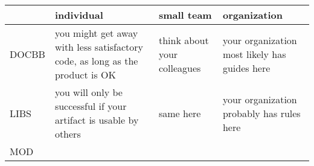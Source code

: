 \documentclass[a4paper
]{article}
\begin{document}
\begin{landscape}

\begin{longtable}[]{@{}llll@{}}
\toprule
\begin{minipage}[b]{0.19\columnwidth}\raggedright
\strut
\end{minipage} & \begin{minipage}[b]{0.28\columnwidth}\raggedright
individual\strut
\end{minipage} & \begin{minipage}[b]{0.28\columnwidth}\raggedright
small team\strut
\end{minipage} & \begin{minipage}[b]{0.14\columnwidth}\raggedright
organization\strut
\end{minipage}\tabularnewline
\midrule
\endhead
\begin{minipage}[t]{0.19\columnwidth}\raggedright
DOCBB\strut
\end{minipage} & \begin{minipage}[t]{0.28\columnwidth}\raggedright
you might get away with less satisfactory code, as long as the product
is OK\strut
\end{minipage} & \begin{minipage}[t]{0.28\columnwidth}\raggedright
think about your colleagues\strut
\end{minipage} & \begin{minipage}[t]{0.14\columnwidth}\raggedright
your organization most likely has guides here\strut
\end{minipage}\tabularnewline
\begin{minipage}[t]{0.19\columnwidth}\raggedright
LIBS\strut
\end{minipage} & \begin{minipage}[t]{0.28\columnwidth}\raggedright
you will only be successful if your artifact is usable by others\strut
\end{minipage} & \begin{minipage}[t]{0.28\columnwidth}\raggedright
same here\strut
\end{minipage} & \begin{minipage}[t]{0.14\columnwidth}\raggedright
your organization probably has rules here\strut
\end{minipage}\tabularnewline
\begin{minipage}[t]{0.19\columnwidth}\raggedright
MOD\strut
\end{minipage} & \begin{minipage}[t]{0.28\columnwidth}\raggedright

\end{minipage}
\end{longtable}
\end{landscape}
\end{document}

